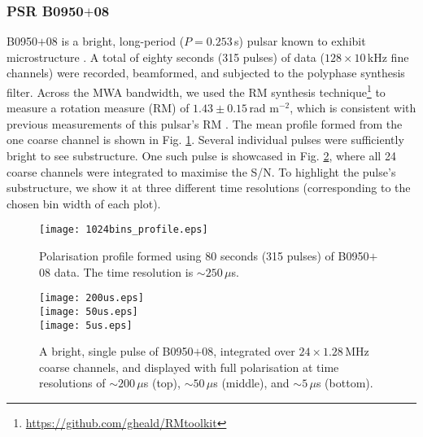 \documentclass{pasa}%
\newcommand{\psrslowB}{B0950$+$08}
\begin{document}

\subsubsection{PSR \psrslowB{}}

\psrslowB{} is a bright, long-period ($P = 0.253\,$s) pulsar known to exhibit microstructure \citep{Popov2002,Kuzmin2003}.
A total of eighty seconds (315 pulses) of data ($128 \times 10\,$kHz fine channels) were recorded, beamformed, and subjected to the polyphase synthesis filter.
Across the MWA bandwidth, we used the RM synthesis technique\footnote{\url{https://github.com/gheald/RMtoolkit}} \citep{Brentjens2005} to measure a rotation measure (RM) of $1.43 \pm 0.15\,$rad m$^{-2}$, which is consistent with previous measurements of this pulsar's RM \citep[e.g.][]{Noutsos2015}.
The mean profile formed from the one coarse channel is shown in Fig. \ref{fig:0950_80_secs}.
Several individual pulses were sufficiently bright to see substructure.
One such pulse is showcased in Fig. \ref{fig:0950_single_pulse}, where all 24 coarse channels were integrated to maximise the S/N.
To highlight the pulse's substructure, we show it at three different time resolutions (corresponding to the chosen bin width of each plot).

\begin{figure}[t!]
    \centering
    \texttt{[image: 1024bins\_profile.eps]}
    \caption{Polarisation profile formed using 80 seconds (315 pulses) of \psrslowB{} data. The time resolution is $\sim 250\,\mu$s.}
    \label{fig:0950_80_secs}
\end{figure}

\begin{figure}[t!]
    \centering
    \texttt{[image: 200us.eps]} \\[10pt]
    \texttt{[image: 50us.eps]} \\[10pt]
    \texttt{[image: 5us.eps]}
    \caption{A bright, single pulse of \psrslowB{}, integrated over $24 \times 1.28\,$MHz coarse channels, and displayed with full polarisation at time resolutions of $\sim 200\,\mu$s (top), $\sim 50\,\mu$s (middle), and $\sim 5\,\mu$s (bottom).}
    \label{fig:0950_single_pulse}
\end{figure}
\end{document}
